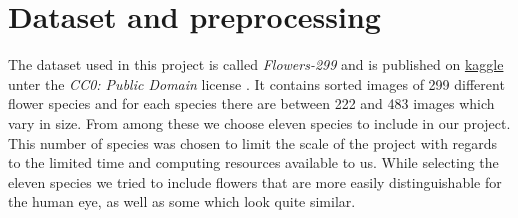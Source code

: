 \section{Dataset and preprocessing}
\label{sec:dataset}
The dataset used in this project is called \textit{Flowers-299} and is published on \href{https://www.kaggle.com/bogdancretu/flower299}{kaggle} unter the \textit{CC0: Public Domain} license \cite{data}.
It contains sorted images of 299 different flower species and for each species there are between 222 and 483 images which vary in size.
From among these we choose eleven species to include in our project.
This number of species was chosen to limit the scale of the project with regards to the limited time and computing resources available to us.
While selecting the eleven species we tried to include flowers that are more easily distinguishable for the human eye, as well as some which look quite similar.

